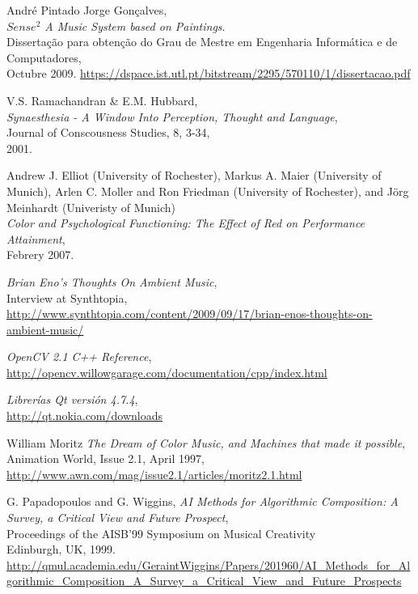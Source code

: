 \begin{thebibliography}{9}
  André Pintado Jorge Gonçalves,\\
  \emph{$Sense^{2}$ A Music System based on Paintings}.\\
  Dissertação para obtenção do Grau de Mestre em Engenharia Informática e de Computadores,\\
  Octubre 2009.
 \url{https://dspace.ist.utl.pt/bitstream/2295/570110/1/dissertacao.pdf}

  V.S. Ramachandran \& E.M. Hubbard,\\
  \emph{Synaesthesia - A Window Into Perception, Thought and Language},\\
  Journal of Conscousness Studies, 8, 3-34,\\
  2001.

  Andrew J. Elliot (University of Rochester), Markus A. Maier (University of Munich), Arlen C. Moller and Ron Friedman (University of Rochester), and Jörg Meinhardt (Univeristy of Munich)\\
  \emph{Color and Psychological Functioning: The Effect of Red on Performance Attainment},\\
  Febrery 2007.  

  \emph{Brian Eno's Thoughts On Ambient Music},\\
  Interview at Synthtopia,\\
  \url{http://www.synthtopia.com/content/2009/09/17/brian-enos-thoughts-on-ambient-music/}

  \emph{OpenCV 2.1 C++ Reference},\\
  \url{http://opencv.willowgarage.com/documentation/cpp/index.html}

  \emph{Librerías Qt versión 4.7.4},\\
  \url{http://qt.nokia.com/downloads}

 William Moritz
 \emph{The Dream of Color Music, and Machines that made it possible},\\
 Animation World, Issue 2.1, April 1997,\\ 
 \url{http://www.awn.com/mag/issue2.1/articles/moritz2.1.html}

 G. Papadopoulos and G. Wiggins,
 \emph{AI Methods for Algorithmic Composition: A Survey, a Critical View  and Future Prospect},\\
 Proceedings of the AISB’99 Symposium on Musical Creativity\\
 Edinburgh, UK, 1999.\\
 \url{http://qmul.academia.edu/GeraintWiggins/Papers/201960/AI_Methods_for_Algorithmic_Composition_A_Survey_a_Critical_View_and_Future_Prospects}


\end{thebibliography}
